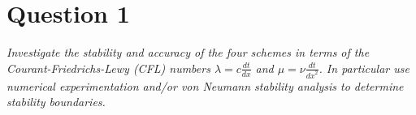\section*{Question 1}
\emph{Investigate the stability and accuracy of the four schemes in terms of the Courant-Friedrichs-Lewy (CFL) numbers $\lambda = c \tfrac{dt}{dx}$ and $\mu = \nu \tfrac{dt}{{dx}^2}$. In particular use numerical experimentation and/or von Neumann stability analysis to determine stability boundaries.}
%
%
%
%
